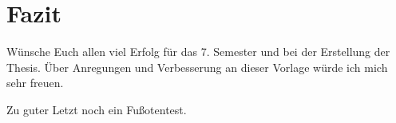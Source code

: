 \section{Fazit}
Wünsche Euch allen viel Erfolg für das 7. Semester und bei der Erstellung der Thesis. Über Anregungen und Verbesserung
an dieser Vorlage würde ich mich sehr freuen.

Zu guter Letzt noch ein Fußotentest.
\textcite{Balzert.2008}
